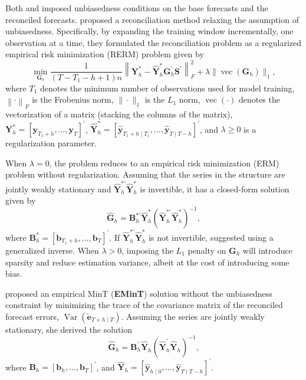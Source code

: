\documentclass[
  11pt]{article}
\theoremstyle{plain}
\theoremstyle{remark}
\begin{document}
Both \citet{Hyndman2011-sd} and \citet{Wickramasuriya2019-fc} imposed
unbiasedness conditions on the base forecasts and the reconciled
forecasts. \citet{Ben_Taieb2019-be} proposed a reconciliation method
relaxing the assumption of unbiasedness. Specifically, by expanding the
training window incrementally, one observation at a time, they
formulated the reconciliation problem as a regularized empirical risk
minimization (RERM) problem given by \[
\min_{\bm{G}_h} \frac{1}{(T-T_1-h+1)n}\left\|\bm{Y}_{h}^{*}-\hat{\bm{Y}}_{h}^{*} \bm{G}_{h}^{\prime} \bm{S}^{\prime}\right\|_F^2+\lambda\|\operatorname{vec}( \bm{G}_h)\|_1,
\] where \(T_1\) denotes the minimum number of observations used for
model training, \(\left\| \cdot \right\|_F\) is the Frobenius norm,
\(\|\cdot\|_1\) is the \(L_1\) norm, \(\operatorname{vec}(\cdot)\)
denotes the vectorization of a matrix (stacking the columns of the
matrix),
\(\bm{Y}_{h}^{*}=\left[\bm{y}_{T_1+h}, \ldots, \bm{y}_T\right]^{\prime}\),
\(\hat{\bm{Y}}_{h}^{*}=\left[\hat{\bm{y}}_{T_1+h \mid T_1}, \ldots, \hat{\bm{y}}_{T \mid T-h}\right]^{\prime}\),
and \(\lambda \geq 0\) is a regularization parameter.

When \(\lambda = 0\), the problem reduces to an empirical risk
minimization (ERM) problem without regularization. Assuming that the
series in the structure are jointly weakly stationary and
\(\hat{\bm{Y}}_{h}^{*\prime}\hat{\bm{Y}}_{h}^{*}\) is invertible, it has
a closed-form solution given by \[
\hat{\bm{G}}_h = \bm{B}_{h}^{*\prime}\hat{\bm{Y}}_{h}^{*}\left(\hat{\bm{Y}}_{h}^{*\prime}\hat{\bm{Y}}_{h}^{*}\right)^{-1},
\] where
\(\bm{B}_{h}^{*}=\left[\bm{b}_{T_1+h}, \ldots, \bm{b}_T\right]^{\prime}\).
If \(\hat{\bm{Y}}_{h}^{*\prime}\hat{\bm{Y}}_{h}^{*}\) is not invertible,
\citet{Ben_Taieb2019-be} suggested using a generalized inverse. When
\(\lambda > 0\), imposing the \(L_1\) penalty on \(\bm{G}_h\) will
introduce sparsity and reduce estimation variance, albeit at the cost of
introducing some bias.

\citet{Wickramasuriya2021-am} proposed an empirical MinT
(\textbf{EMinT}) solution without the unbiasedness constraint by
minimizing the trace of the covariance matrix of the reconciled forecast
errors, \(\operatorname{Var}(\tilde{\bm{e}}_{T+h \mid T})\). Assuming
the series are jointly weakly stationary, she derived the solution \[
\hat{\bm{G}}_{h} = \bm{B}_{h}^{\prime}\hat{\bm{Y}}_{h}\left(\hat{\bm{Y}}_{h}^{\prime}\hat{\bm{Y}}_{h}\right)^{-1},
\] where
\(\bm{B}_{h}=\left[\bm{b}_{h}, \ldots, \bm{b}_T\right]^{\prime}\), and
\(\hat{\bm{Y}}_{h}=\left[\hat{\bm{y}}_{h \mid 0}, \ldots, \hat{\bm{y}}_{T \mid T-h}\right]^{\prime}\).
\end{document}
